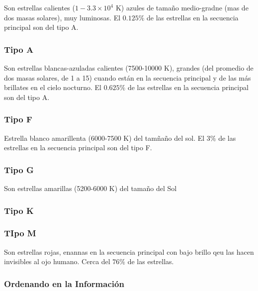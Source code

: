 Son estrellas calientes ($1-3.3 \times 10^4$ K) azules de tamaño medio-gradne (mas de dos masas solares), muy luminosas. El $0.125\%$ de las estrellas en la secuencia principal son del tipo A.

\subsubsection{Tipo A}

Son estrellas blancas-azuladas calientes (7500-10000 K), grandes (del promedio de dos masas solares, de 1 a 15) cuando están en la secuencia principal y de las más brillates en el cielo nocturno.  El $0.625\%$ de las estrellas en la secuencia principal son del tipo A.

\subsubsection{Tipo F}

Estrella blanco amarillenta (6000-7500 K) del tamñaño del sol. El $3\%$ de las estrellas en la secuencia principal son del tipo F. 

\subsubsection{Tipo G}

Son estrellas amarillas (5200-6000 K) del tamaño del Sol 

\subsubsection{Tipo K}

\subsubsection{TIpo M}

Son estrellas rojas, enannas en la secuencia principal con bajo brillo qeu las hacen invisibles al ojo humano. Cerca del $76\%$ de las estrellas. 

\subsubsection{Ordenando en la Información}



